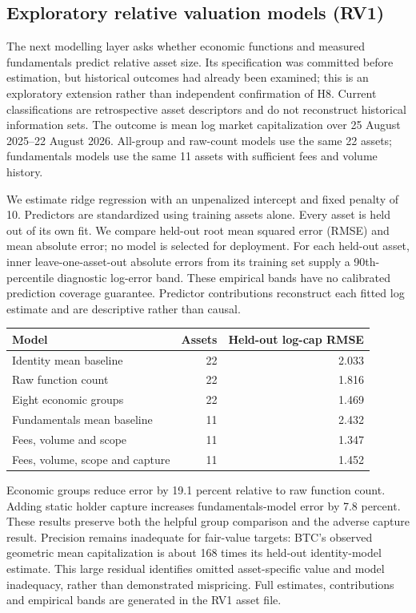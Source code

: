\documentclass[10pt]{article}
\begin{document}
\subsection{Exploratory relative valuation models (RV1)}
The next modelling layer asks whether economic functions and measured fundamentals predict relative asset size. Its specification was committed before estimation, but historical outcomes had already been examined; this is an exploratory extension rather than independent confirmation of H8. Current classifications are retrospective asset descriptors and do not reconstruct historical information sets. The outcome is mean log market capitalization over 25 August 2025--22 August 2026. All-group and raw-count models use the same 22 assets; fundamentals models use the same 11 assets with sufficient fees and volume history.

We estimate ridge regression with an unpenalized intercept and fixed penalty of 10. Predictors are standardized using training assets alone. Every asset is held out of its own fit. We compare held-out root mean squared error (RMSE) and mean absolute error; no model is selected for deployment. For each held-out asset, inner leave-one-asset-out absolute errors from its training set supply a 90th-percentile diagnostic log-error band. These empirical bands have no calibrated prediction coverage guarantee. Predictor contributions reconstruct each fitted log estimate and are descriptive rather than causal.

\begin{center}
\begin{tabular}{lrr}
\toprule
Model & Assets & Held-out log-cap RMSE \\
\midrule
Identity mean baseline & 22 & 2.033 \\
Raw function count & 22 & 1.816 \\
Eight economic groups & 22 & 1.469 \\
Fundamentals mean baseline & 11 & 2.432 \\
Fees, volume and scope & 11 & 1.347 \\
Fees, volume, scope and capture & 11 & 1.452 \\
\bottomrule
\end{tabular}
\end{center}

Economic groups reduce error by 19.1 percent relative to raw function count. Adding static holder capture increases fundamentals-model error by 7.8 percent. These results preserve both the helpful group comparison and the adverse capture result. Precision remains inadequate for fair-value targets: BTC's observed geometric mean capitalization is about 168 times its held-out identity-model estimate. This large residual identifies omitted asset-specific value and model inadequacy, rather than demonstrated mispricing. Full estimates, contributions and empirical bands are generated in the RV1 asset file.
\end{document}
